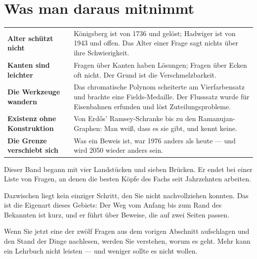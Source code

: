 \section{Was man daraus mitnimmt}

\begin{merksatz}
\begin{center}
\renewcommand{\arraystretch}{1.55}
\begin{tabular}{@{}P{3.0cm}P{5.6cm}@{}}
\toprule
\textbf{Alter schützt nicht} & Königsberg ist von 1736 und gelöst; Hadwiger ist von 1943 und offen. Das Alter einer Frage sagt nichts über ihre Schwierigkeit.\\
\textbf{Kanten sind leichter} & Fragen über Kanten haben Lösungen; Fragen über Ecken oft nicht. Der Grund ist die Verschmelzbarkeit.\\
\textbf{Die Werkzeuge wandern} & Das chromatische Polynom scheiterte am Vierfarbensatz und brachte eine Fields-Medaille. Der Flusssatz wurde für Eisenbahnen erfunden und löst Zuteilungsprobleme.\\
\textbf{Existenz ohne Konstruktion} & Von Erdős' Ramsey-Schranke bis zu den Ramanujan-Graphen: Man weiß, dass es sie gibt, und kennt keine.\\
\textbf{Die Grenze verschiebt sich} & Was ein Beweis ist, war 1976 anders als heute --- und wird 2050 wieder anders sein.\\
\bottomrule
\end{tabular}
\end{center}
\end{merksatz}

\begin{merksatz}
\begin{center}
\begin{minipage}{0.9\textwidth}
Dieser Band begann mit vier Landstücken und sieben Brücken. Er endet bei einer Liste von Fragen, an denen die besten Köpfe des Fachs seit Jahrzehnten arbeiten.

Dazwischen liegt kein einziger Schritt, den Sie nicht nachvollziehen konnten. Das ist die Eigenart dieses Gebiets: Der Weg vom Anfang bis zum Rand des Bekannten ist kurz, und er führt über Beweise, die auf zwei Seiten passen.

Wenn Sie jetzt eine der zwölf Fragen aus dem vorigen Abschnitt aufschlagen und den Stand der Dinge nachlesen, werden Sie verstehen, worum es geht. Mehr kann ein Lehrbuch nicht leisten --- und weniger sollte es nicht wollen.
\end{minipage}
\end{center}
\end{merksatz}
